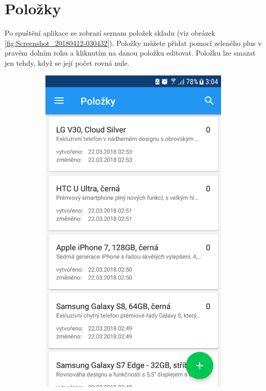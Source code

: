 \documentclass[12pt]{report}
\begin{document}
\section{Položky}	
Po spuštění aplikace se zobrazí seznam položek skladu (viz obrázek \ref{fig:Screenshot_20180412-030432}).
Položky můžete přidat pomocí zeleného plus v pravém dolním rohu a kliknutím na danou položku editovat.
Položku lze smazat jen tehdy, když se její počet rovná nule.
\begin{figure}[H]
	\centering
  \begin{subfigure}[b]{0.3\textwidth}
    \centering
	\includegraphics[width=\textwidth]{../images/client_android/Screenshot_20180412-030432.png}	

\end{subfigure}
\end{figure}
\end{document}
